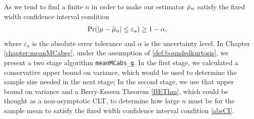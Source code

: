 \documentclass{iitthesis}
\begin{document}
As we tend to find a finite $n$ in order to make our estimator $\hat{\mu}_n$ satisfy the fixed width confidence interval condition 
\begin{align}\label{absCI}
\Pr(\left \lvert \mu-\hat{\mu}_n \right \rvert \leq \varepsilon_a) \geq 1-\alpha,
\end{align}
where $\varepsilon_a$ is the absolute error tolerance and $\alpha$ is the uncertainty level. 
In Chapter \ref{chapter:meanMCabsg}, under the assumption of \eqref{def:boundedkurtosis}, we present a two stage algorithm {\tt meanMCabs\_g}. In the first stage, we calculated a conservative upper bound on variance, which would be used to determine the sample size needed in the next stage; In the second stage, we use that upper bound on variance and a Berry-Esseen Theorem \ref{BEThm}, which could be thought as a non-asymptotic CLT, to determine how large $n$ must be for the sample mean to satisfy the fixed width confidence interval condition \eqref{absCI}.
\end{document}
